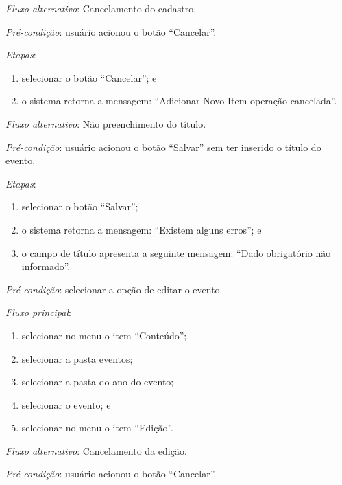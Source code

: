 \noindent \textit{Fluxo alternativo}: Cancelamento do cadastro.

\noindent \textit{Pré-condição}:  usuário acionou o botão ``Cancelar''.

\noindent \textit{Etapas}:

\begin{enumerate}
    \item selecionar o botão ``Cancelar''; e
    \item o sistema retorna a mensagem: ``Adicionar Novo Item operação cancelada''.
\end{enumerate}

\noindent \textit{Fluxo alternativo}: Não preenchimento do título.

\noindent \textit{Pré-condição}: usuário acionou o botão ``Salvar'' sem ter inserido o título do evento.

\noindent \textit{Etapas}:

\begin{enumerate}
    \item selecionar o botão ``Salvar'';
    \item o sistema retorna a mensagem: ``Existem alguns erros''; e
    \item o campo de título apresenta a seguinte mensagem: ``Dado obrigatório não informado''.
\end{enumerate}



\vspace{0.7cm}

\noindent \textit{Pré-condição}: selecionar a opção de editar o evento.

\noindent \textit{Fluxo principal}:

\begin{enumerate}
    \item selecionar no menu o item ``Conteúdo'';
    \item selecionar a pasta eventos;
    \item selecionar a pasta do ano do evento;
    \item selecionar o evento; e
    \item selecionar no menu o item ``Edição''.
\end{enumerate}

\noindent \textit{Fluxo alternativo}: Cancelamento da edição.

\noindent \textit{Pré-condição}: usuário acionou o botão ``Cancelar''.


